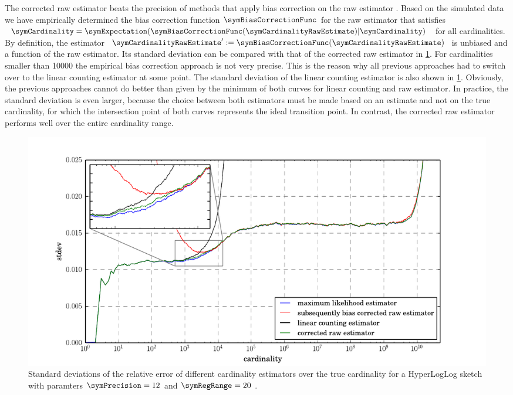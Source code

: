 \documentclass[a4paper]{scrartcl}
\begin{document}
The corrected raw estimator beats the precision of methods that apply bias correction on the raw estimator \cite{Heule2013,Rhodes2015,Sanfilippo2014}.
Based on the simulated data we have empirically determined the bias correction function $\symBiasCorrectionFunc$ for the raw estimator that satisfies $\symCardinality = \symExpectation(\symBiasCorrectionFunc(\symCardinalityRawEstimate)\vert\symCardinality)$ for all cardinalities. By definition, 
the estimator $\symCardinalityRawEstimate':=\symBiasCorrectionFunc(\symCardinalityRawEstimate)$ is unbiased and a function of the raw estimator. Its standard deviation can be compared with that of the corrected raw estimator in \cref{fig:stdev_comparison}. For cardinalities smaller than \num{10000} the empirical bias correction approach is not very precise. This is the reason why all previous approaches had to switch over to the linear counting estimator at some point. The standard deviation of the linear counting estimator is also shown in \cref{fig:stdev_comparison}. Obviously, the previous approaches cannot do better than given by the minimum of both curves for linear counting and raw estimator. In practice, the standard deviation is even larger, because the choice between both estimators must be made based on an estimate and not on the true cardinality, for which the intersection point of both curves represents the ideal transition point. In contrast, the corrected raw estimator performs well over the entire cardinality range.

\begin{figure}
\centering
\includegraphics[width=1\textwidth]{stdev_comparison}
\caption{Standard deviations of the relative error of different cardinality estimators over the true cardinality for a HyperLogLog sketch with paramters $\symPrecision = 12$ and $\symRegRange=20$ .}
\label{fig:stdev_comparison}
\end{figure}
\end{document}
